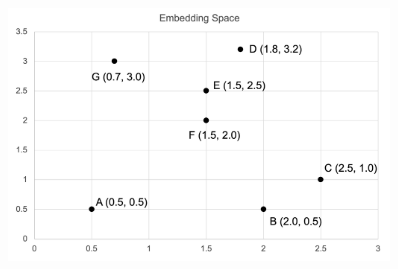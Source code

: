 \documentclass{article}
\numberwithin{figure}{section}
\begin{document}
\begin{figure}[H]
    \centering
    \includegraphics[width=0.9\textwidth]{5.4.png}
    \label{fig:5.4}
\end{figure}
\end{document}
